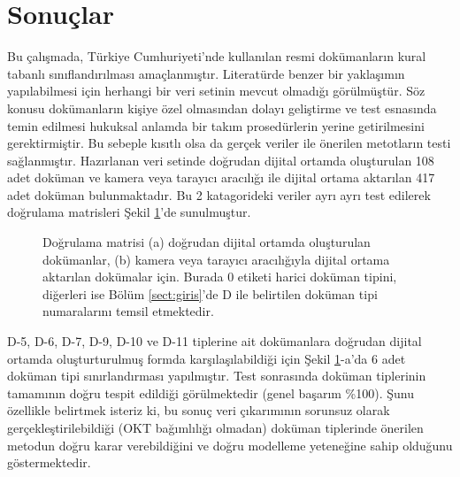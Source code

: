 \documentclass[conference, a4paper]{IEEEtran}
\begin{document}
\section{Sonuçlar}
\label{sec:result}
Bu çalışmada, Türkiye Cumhuriyeti'nde kullanılan resmi dokümanların kural tabanlı sınıflandırılması amaçlanmıştır.
Literatürde benzer bir yaklaşımın yapılabilmesi için herhangi bir veri setinin mevcut olmadığı görülmüştür. Söz konusu
dokümanların kişiye özel olmasından dolayı geliştirme ve test esnasında temin edilmesi hukuksal anlamda bir takım
prosedürlerin yerine getirilmesini gerektirmiştir. Bu sebeple kısıtlı olsa da gerçek veriler ile önerilen metotların
testi sağlanmıştır. Hazırlanan veri setinde doğrudan dijital ortamda oluşturulan 108 adet doküman ve kamera veya
tarayıcı aracılığı ile dijital ortama aktarılan 417 adet doküman bulunmaktadır. Bu 2 katagorideki veriler ayrı ayrı
test edilerek doğrulama matrisleri Şekil \ref{fig:dogrulamamatrisi}'de sunulmuştur.

\begin{figure}[th]
    \centering
    \shorthandoff{=}
    \par\medskip
    \shorthandon{=}
    \caption{Doğrulama matrisi (a) doğrudan dijital ortamda oluşturulan dokümanlar, (b) kamera veya tarayıcı
        aracılığıyla dijital ortama aktarılan dokümalar için. Burada $0$ etiketi harici doküman tipini, diğerleri ise
        Bölüm \ref{sect:giris}'de D ile belirtilen doküman tipi numaralarını temsil etmektedir.}
    \label{fig:dogrulamamatrisi}
\end{figure}

D-5, D-6, D-7, D-9, D-10 ve D-11 tiplerine ait dokümanlara doğrudan dijital ortamda oluşturturulmuş formda
karşılaşılabildiği için Şekil \ref{fig:dogrulamamatrisi}-a'da 6 adet doküman tipi sınırlandırması yapılmıştır. Test
sonrasında doküman tiplerinin tamamının doğru tespit edildiği görülmektedir (genel başarım \%100). Şunu özellikle
belirtmek isteriz ki, bu sonuç veri çıkarımının sorunsuz olarak gerçekleştirilebildiği (OKT bağımlılığı olmadan)
doküman tiplerinde önerilen metodun doğru karar verebildiğini ve doğru modelleme yeteneğine sahip olduğunu
göstermektedir.
\end{document}

